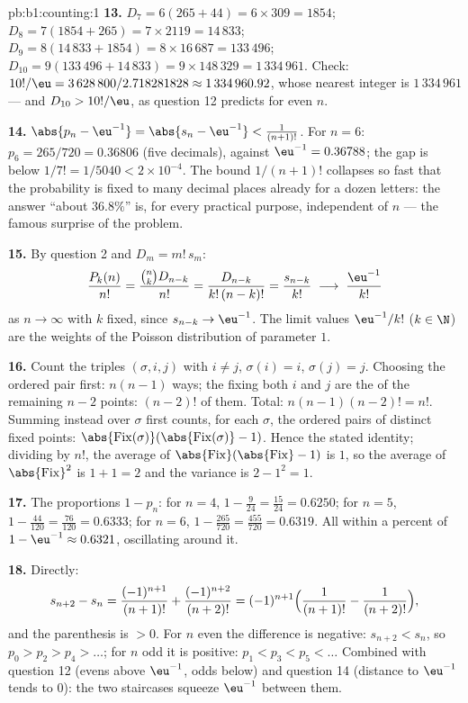 \begin{solution}{pb:b1:counting:1}
\textbf{13.} $D_7 = 6(265 + 44) = 6 \times 309 = 1854$; $D_8 =
7(1854 + 265) = 7 \times 2119 = 14\,833$; $D_9 = 8(14\,833 + 1854)
= 8 \times 16\,687 = 133\,496$; $D_{10} = 9(133\,496 + 14\,833) =
9 \times 148\,329 = 1\,334\,961$. Check: $10!/\eu = 3\,628\,800 /
2.718281828 \approx 1\,334\,960.92$, whose nearest integer is
$1\,334\,961$ --- and $D_{10} > 10!/\eu$, as question 12 predicts
for even $n$.

\textbf{14.} $\abs{p_n - \eu^{-1}} = \abs{s_n - \eu^{-1}} <
\frac1{(n+1)!}$. For $n = 6$: $p_6 = 265/720 = 0.36806$ (five
decimals), against $\eu^{-1} = 0.36788$; the gap is below $1/7! =
1/5040 < 2 \times 10^{-4}$. The bound $1/(n+1)!$ collapses so fast
that the probability is fixed to many decimal places already for a
dozen letters: the answer ``about $36.8\%$'' is, for every
practical purpose, independent of $n$ --- the famous surprise of
the problem.

\textbf{15.} By question 2 and $D_m = m!\,s_m$:
\[
\frac{P_k(n)}{n!} = \frac{\binom nk D_{n-k}}{n!}
= \frac{D_{n-k}}{k!\,(n-k)!} = \frac{s_{n-k}}{k!}
\;\longrightarrow\; \frac{\eu^{-1}}{k!}
\]
as $n \to \infty$ with $k$ fixed, since $s_{n-k} \to \eu^{-1}$.
The limit values $\eu^{-1}/k!$ ($k \in \N$) are the weights of the
Poisson distribution of parameter $1$.

\textbf{16.} Count the triples $(\sigma, i, j)$ with $i \neq j$,
$\sigma(i) = i$, $\sigma(j) = j$. Choosing the ordered pair first:
$n(n-1)$ ways; the  fixing both $i$ and $j$ are the
 of the remaining $n - 2$ points: $(n-2)!$ of them.
Total: $n(n-1)(n-2)! = n!$. Summing instead over $\sigma$ first
counts, for each $\sigma$, the ordered pairs of distinct fixed
points: $\abs{\mathrm{Fix}(\sigma)}(\abs{\mathrm{Fix}(\sigma)}-1)$.
Hence the stated identity; dividing by $n!$, the average of
$\abs{\mathrm{Fix}}(\abs{\mathrm{Fix}} - 1)$ is $1$, so the average
of $\abs{\mathrm{Fix}}^2$ is $1 + 1 = 2$ and the variance is $2 -
1^2 = 1$.

\textbf{17.} The proportions $1 - p_n$: for $n = 4$, $1 - \frac
9{24} = \frac{15}{24} = 0.6250$; for $n = 5$, $1 - \frac{44}{120} =
\frac{76}{120} = 0.6333$; for $n = 6$, $1 - \frac{265}{720} =
\frac{455}{720} = 0.6319$. All within a percent of $1 - \eu^{-1}
\approx 0.6321$, oscillating around it.

\textbf{18.} Directly:
\[
s_{n+2} - s_n = \frac{(-1)^{n+1}}{(n+1)!} +
\frac{(-1)^{n+2}}{(n+2)!}
= (-1)^{n+1}\Bigl(\frac1{(n+1)!} - \frac1{(n+2)!}\Bigr),
\]
and the parenthesis is $> 0$. For $n$ even the difference is
negative: $s_{n+2} < s_n$, so $p_0 > p_2 > p_4 > \dots$; for $n$
odd it is positive: $p_1 < p_3 < p_5 < \dots$ Combined with
question 12 (evens above $\eu^{-1}$, odds below) and question 14
(distance to $\eu^{-1}$ tends to $0$): the two staircases squeeze
$\eu^{-1}$ between them.


\end{solution}
